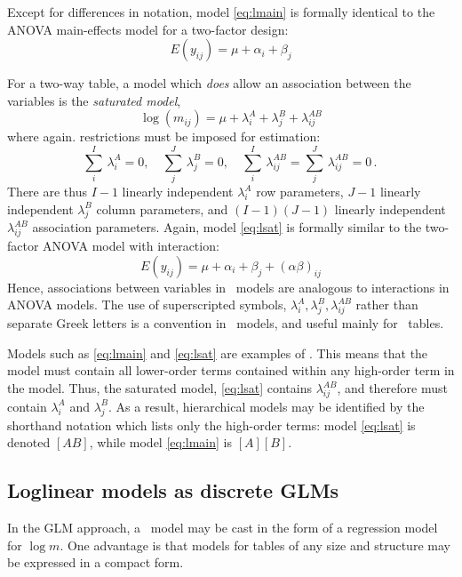 Except for differences in notation,
model \eqref{eq:lmain} is formally identical to the ANOVA main-effects model for
a two-factor design:
\begin{equation*}
  E ( y_{ij} ) = \mu  +  \alpha _i  +  \beta _j
\end{equation*}

For a two-way table, a model which \emph{does} allow an association between the variables is the \emph{saturated model},
\begin{equation}\label{eq:lsat}
\log ( m_{ij} ) = \mu  +  \lambda_i^A
+  \lambda_j^B  +  \lambda_{ij}^{AB}
\end{equation}
where again. restrictions must be imposed for estimation:
\begin{equation}\label{eq:lrestrict}
\sum_i^I \,  \lambda_i^A  = 0, \quad
\sum_j^J \,  \lambda_j^B = 0, \quad
\sum_i^I \,  \lambda_{ij}^{AB} =
\sum_j^J \,  \lambda_{ij}^{AB} = 0  \period
\end{equation}
There are thus $I-1$ linearly independent $\lambda_i^A$ row parameters,
$J-1$ linearly independent $\lambda_j^B$ column parameters,
and $(I-1)(J-1)$ linearly independent $\lambda_{ij}^{AB}$ association  parameters.
Again, model \eqref{eq:lsat} is formally similar to the two-factor ANOVA model with interaction:
\begin{equation*}
  E ( y_{ij} ) = \mu  +  \alpha _i  +  \beta _j
  +  ( \alpha  \beta  )_{ij}
\end{equation*}
Hence, associations between variables in \loglin\ models are
analogous to interactions in ANOVA models.  The use of superscripted symbols,
$\lambda_i^A, \lambda_j^B , \lambda_{ij}^{AB}$ rather than separate
Greek letters is a convention in \loglin\ models, and useful mainly
for \mway\ tables.

Models such as \eqref{eq:lmain} and \eqref{eq:lsat} are
examples of .
This means that the model must contain all lower-order terms contained
within any high-order term in the model.
Thus, the saturated model, \eqref{eq:lsat} contains $\lambda_{ij}^{AB}$,
and therefore must contain $\lambda_i^A $ and $\lambda_j^B$.
As a result, hierarchical models may be identified by the shorthand
notation which lists only the high-order terms: model \eqref{eq:lsat}
is denoted $[A B]$, while model \eqref{eq:lmain} is $[A] [B]$.

\subsection{Loglinear models as discrete GLMs}
In the GLM approach, a \loglin\ model may be cast in the form of a regression
model for $\log m$.
One advantage is that models for tables of any size and structure
may be expressed in a compact form.

